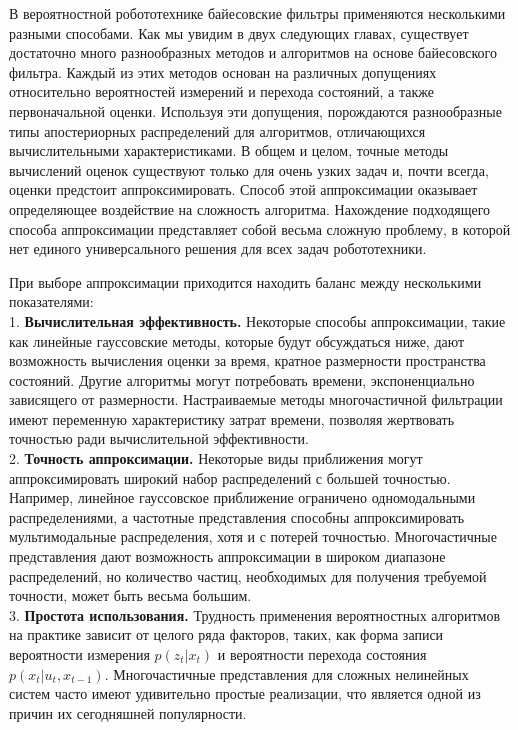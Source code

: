 \documentclass[10pt,a4paper]{article}
\begin{document}
 В вероятностной робототехнике байесовские фильтры применяются несколькими разными способами. Как мы увидим в двух следующих главах, существует достаточно много разнообразных методов и алгоритмов на основе байесовского фильтра. Каждый из этих методов основан на различных допущениях относительно вероятностей измерений и перехода состояний, а также первоначальной оценки. Используя эти допущения, порождаются разнообразные типы апостериорных распределений для алгоритмов, отличающихся вычислительными характеристиками.  В общем и целом, точные методы вычислений оценок существуют только для очень узких задач и, почти всегда, оценки предстоит аппроксимировать. Способ этой аппроксимации оказывает определяющее воздействие на сложность алгоритма. Нахождение подходящего способа аппроксимации представляет собой весьма сложную проблему, в которой нет единого универсального решения для всех задач робототехники.
 
 При выборе аппроксимации приходится находить баланс между несколькими показателями:\\
 
 1. \textbf{Вычислительная эффективность.} Некоторые способы аппроксимации, такие как линейные гауссовские методы, которые будут обсуждаться ниже, дают возможность вычисления оценки за время, кратное размерности пространства состояний. Другие алгоритмы могут потребовать времени, экспоненциально зависящего от размерности. Настраиваемые методы многочастичной фильтрации имеют переменную характеристику затрат времени, позволяя жертвовать точностью ради вычислительной эффективности.\\
  
 2. \textbf{Точность аппроксимации.} Некоторые виды приближения могут аппроксимировать широкий набор распределений с большей точностью. Например, линейное гауссовское приближение ограничено одномодальными распределениями, а частотные представления способны аппроксимировать мультимодальные распределения, хотя и с потерей точностью. Многочастичные представления дают возможность аппроксимации в широком диапазоне распределений, но количество частиц, необходимых для получения требуемой точности, может быть весьма большим.\\
 
 3. \textbf{Простота использования.} Трудность применения вероятностных алгоритмов на практике зависит от целого ряда факторов, таких, как форма записи вероятности измерения $p(z_t | x_t)$ и вероятности перехода состояния $p(x_t |u_t, x_{t-1})$. Многочастичные представления для сложных нелинейных систем часто имеют удивительно простые  реализации, что является одной из причин их сегодняшней популярности.\\ 
\end{document}
